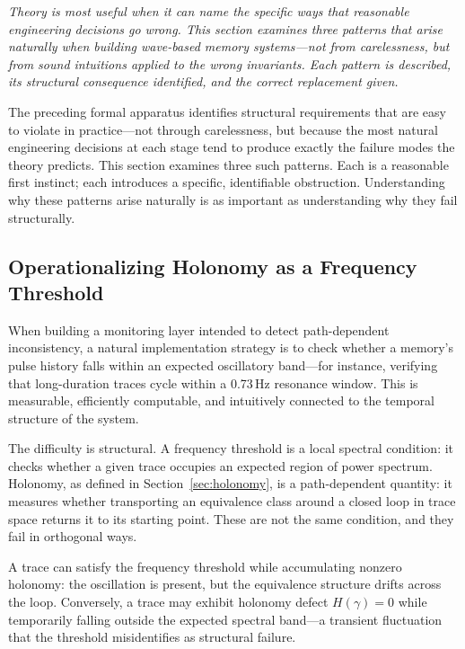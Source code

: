 \documentclass[12pt,a4paper]{article}
\begin{document}
\textit{Theory is most useful when it can name the specific ways that reasonable engineering decisions go wrong. This section examines three patterns that arise naturally when building wave-based memory systems---not from carelessness, but from sound intuitions applied to the wrong invariants. Each pattern is described, its structural consequence identified, and the correct replacement given.}

The preceding formal apparatus identifies structural requirements that are easy to violate in practice---not through carelessness, but because the most natural engineering decisions at each stage tend to produce exactly the failure modes the theory predicts. This section examines three such patterns. Each is a reasonable first instinct; each introduces a specific, identifiable obstruction. Understanding why these patterns arise naturally is as important as understanding why they fail structurally.

\subsection{Operationalizing Holonomy as a Frequency Threshold}

When building a monitoring layer intended to detect path-dependent inconsistency, a natural implementation strategy is to check whether a memory's pulse history falls within an expected oscillatory band---for instance, verifying that long-duration traces cycle within a 0.73\,Hz resonance window. This is measurable, efficiently computable, and intuitively connected to the temporal structure of the system.

The difficulty is structural. A frequency threshold is a local spectral condition: it checks whether a given trace occupies an expected region of power spectrum. Holonomy, as defined in Section~\ref{sec:holonomy}, is a path-dependent quantity: it measures whether transporting an equivalence class around a closed loop in trace space returns it to its starting point. These are not the same condition, and they fail in orthogonal ways.

A trace can satisfy the frequency threshold while accumulating nonzero holonomy: the oscillation is present, but the equivalence structure drifts across the loop. Conversely, a trace may exhibit holonomy defect $H(\gamma) = 0$ while temporarily falling outside the expected spectral band---a transient fluctuation that the threshold misidentifies as structural failure.
\end{document}

